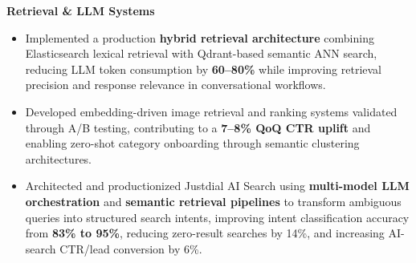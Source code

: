 \documentclass[10pt,a4paper]{article}
\begin{document}
\vspace{0pt}
\textbf{Retrieval \& LLM Systems}

\begin{itemize}[leftmargin=*,
itemsep=1pt,
topsep=0pt,
parsep=1pt,
partopsep=1pt]

\item Implemented a production \textbf{hybrid retrieval architecture} combining Elasticsearch lexical retrieval with Qdrant-based semantic ANN search, reducing LLM token consumption by \textbf{60--80\%} while improving retrieval precision and response relevance in conversational workflows.

\item Developed embedding-driven image retrieval and ranking systems validated through A/B testing, contributing to a \textbf{7--8\% QoQ CTR uplift} and enabling zero-shot category onboarding through semantic clustering architectures.



\item Architected and productionized Justdial AI Search using \textbf{multi-model LLM orchestration} and \textbf{semantic retrieval pipelines} to transform ambiguous queries into structured search intents, improving intent classification accuracy from \textbf{83\% to 95\%}, reducing zero-result searches by 14\%, and increasing AI-search CTR/lead conversion by 6\%.




\end{itemize}
\end{document}
